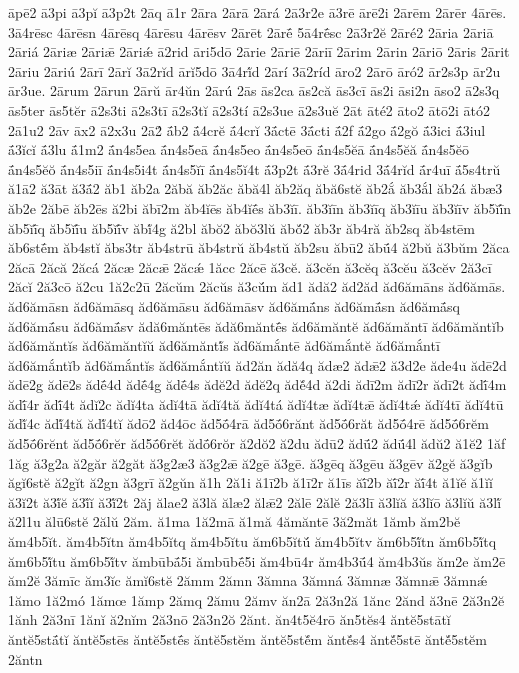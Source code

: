 {āpē2
ā3pi
ā3pĭ
ā3p2t
2āq
ā1r
2āra
2ārā
2ārá
2ā3r2e
ā3rē
ārē2i
2ārēm
2ārēr
4ārēs.
3ā4rēsc
4ārēsn
4ārēsq
4ārēsu
4ārēsv
2ārēt
2ārḗ
5ā4rḗsc
2ā3r2ĕ
2āré2
2āria
2āriā
2āriá
2āriæ
2āriǣ
2āriǽ
ā2rid
āri5dō
2ārie
2āriē
2āriī
2ārim
2ārin
2āriō
2āris
2ārit
2āriu
2āriú
2ārī
2ārĭ
3ā2rĭd
ārĭ5dō
3ā4rĭ́d
2ārí
3ā2ríd
āro2
2ārō
āró2
ār2s3p
ār2u
ār3ue.
2ārum
2ārun
2ārŭ
ār4ŭn
2ārú
2ās
ās2ca
ās2că
ās3cī
ās2i
āsi2n
āso2
ā2s3q
ās5ter
ās5tĕr
ā2s3ti
ā2s3tī
ā2s3tĭ
ā2s3tí
ā2s3ue
ā2s3uĕ
2āt
āté2
āto2
ātō2i
ātó2
2ā1u2
2āv
āx2
ā2x3u
2ā2́
ā́b2
ā́4crĕ
ā́4crĭ
3ā́ctē
3ā́cti
ā́2f
ā́2go
ā́2gŏ
ā́3ici
ā́3iul
ā́3ĭcĭ
ā́3lu
ā́1m2
ā́n4s5ea
ā́n4s5eā
ā́n4s5eo
ā́n4s5eō
ā́n4s5ĕā
ā́n4s5ĕă
ā́n4s5ĕō
ā́n4s5ĕŏ
ā́n4s5iī
ā́n4s5i4t
ā́n4s5ĭī
ā́n4s5ĭ4t
ā́3p2t
ā́3rĕ
3ā́4rid
3ā́4rĭd
ā́r4uī
ā́5s4trŭ
ă1ā2
ă3āt
ă3ā́2
ăb1
ăb2a
2ăbă
ăb2ăc
ăbă4l
ăb2ăq
ăbă6stĕ
ăb2ắ
ăb3ắl
ăb2á
ăbæ3
ăb2e
2ăbē
ăb2ēs
ă2bi
ăbī2m
ăb4ĭēs
ăb4ĭḗs
ăb3ĭī.
ăb3ĭīn
ăb3ĭīq
ăb3ĭīu
ăb3ĭīv
ăb5ĭī́n
ăb5ĭī́q
ăb5ĭī́u
ăb5ĭī́v
ăbĭ́4g
ă2bl
ăbŏ2
ăbŏ3lŭ
ăbŏ́2
ăb3r
ăb4ră
ăb2sq
ăb4stēm
ăb6stḗm
ăb4stĭ
ăbs3tr
ăb4strū
ăb4strŭ
ăb4stŭ
ăb2su
ăbū2
ăbū́4
ă2bŭ
ă3bŭm
2ăca
2ăcā
2ăcă
2ăcá
2ăcæ
2ăcǣ
2ăcǽ
1ăcc
2ăcē
ă3cĕ.
ă3cĕn
ă3cĕq
ă3cĕu
ă3cĕv
2ă3cī
2ăcĭ
2ă3cō
ă2cu
1ă2c2ū
2ăcŭm
2ăcŭs
ă3cŭ́m
ăd1
ădă2
ăd2ăd
ăd6ămāns
ăd6ămās.
ăd6ămāsn
ăd6ămāsq
ăd6ămāsu
ăd6ămāsv
ăd6ămā́ns
ăd6ămā́sn
ăd6ămā́sq
ăd6ămā́su
ăd6ămā́sv
ădă6măntēs
ădă6măntḗs
ăd6ămăntĕ
ăd6ămăntī
ăd6ămăntĭb
ăd6ămăntĭs
ăd6ămăntĭŭ
ăd6ămăntĭ́s
ăd6ămắntē
ăd6ămắntĕ
ăd6ămắntī
ăd6ămắntĭb
ăd6ămắntĭs
ăd6ămắntĭŭ
ăd2ăn
ădă4q
ădæ2
ădǣ2
ă3d2e
ăde4u
ădē2d
ădē2g
ădē2s
ădḗ4d
ădḗ4g
ădḗ4s
ădĕ2d
ădĕ2q
ădĕ́4d
ă2di
ădī2m
ădī2r
ădī2t
ădī́4m
ădī́4r
ădī́4t
ădĭ2c
ădĭ4ta
ădĭ4tā
ădĭ4tă
ădĭ4tá
ădĭ4tæ
ădĭ4tǣ
ădĭ4tǽ
ădĭ4tī
ădĭ4tū
ădĭ́4c
ădĭ́4tă
ădĭ́4tĭ
ădō2
ăd4ōc
ăd5ṓ4rā
ăd5ṓ6rănt
ăd5ṓ6răt
ăd5ṓ4rē
ăd5ṓ6rĕm
ăd5ṓ6rĕnt
ăd5ṓ6rĕr
ăd5ṓ6rĕt
ădṓ6rŏr
ă2dŏ2
ă2du
ădū2
ădū́2
ădū́4l
ădŭ2
ă1ĕ2
1ăf
1ăg
ă3g2a
ă2găr
ă2găt
ă3g2æ3
ă3g2ǣ
ă2gē
ă3gē.
ă3gēq
ă3gēu
ă3gēv
ă2gĕ
ă3gĭb
ăgĭ6stĕ
ă2gĭt
ă2gn
ă3grī
ă2gŭn
ă1h
2ă1i
ă1ī2b
ă1ī2r
ă1īs
ăī́2b
ăī́2r
ăī́4t
ă1ĭĕ
ă1ĭĭ
ă3ĭ2t
ă3ĭ́ĕ
ă3ĭ́ĭ
ă3ĭ́2t
2ăj
ălae2
ă3lă
ălæ2
ălǣ2
2ălē
2ălĕ
2ă3lī
ă3lĭă
ă3lĭō
ă3lĭŭ
ă3lĭ́
ă2l1u
ălū6stĕ
2ălŭ
2ăm.
ă1ma
1ă2mā
ă1mă
4ămăntē
3ă2măt
1ămb
ăm2bĕ
ăm4b5ĭt.
ăm4b5ĭtn
ăm4b5ĭtq
ăm4b5ĭtu
ăm6b5ĭtŭ́
ăm4b5ĭtv
ăm6b5ĭ́tn
ăm6b5ĭ́tq
ăm6b5ĭ́tu
ăm6b5ĭ́tv
ămbūbā́5i
ămbūbḗ5i
ăm4bū4r
ăm4b3ū́4
ăm4b3ŭs
ăm2e
ăm2ē
ăm2ĕ
3ămīc
ăm3ĭc
ămĭ6stĕ
2ămm
2ămn
3ămna
3ămná
3ămnæ
3ămnǣ
3ămnǽ
1ămo
1ă2mó
1ămœ
1ămp
2ămq
2ămu
2ămv
ăn2ā
2ă3n2ă
1ănc
2ănd
ă3nē
2ă3n2ĕ
1ănh
2ă3nī
1ănĭ
ă2nĭm
2ă3nō
2ă3n2ŏ
2ănt.
ăn4t5ĕ4rō
ăn5tĕs4
ăntĕ5stātĭ
ăntĕ5stā́tĭ
ăntĕ5stēs
ăntĕ5stḗs
ăntĕ5stĕm
ăntĕ5stĕ́m
ăntĕ́s4
ăntĕ́5stē
ăntĕ́5stĕm
2ăntn
}

